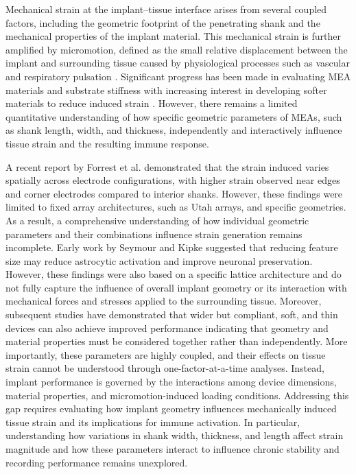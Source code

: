 \documentclass[fleqn,10pt]{wlscirep}
\begin{document}
Mechanical strain at the implant--tissue interface arises from several coupled factors, including the geometric footprint of the penetrating shank and the mechanical properties of the implant material. This mechanical strain is further amplified by micromotion, defined as the small relative displacement between the implant and surrounding tissue caused by physiological processes such as vascular and respiratory pulsation \cite{Subbaroyan2005, AlAbed2022, Muthuswamy2005}. Significant progress has been made in evaluating MEA materials \cite{Subbaroyan2005, AlAbed2022} and substrate stiffness \cite{Subbaroyan2005, Sridharan2015} with increasing interest in developing softer materials to reduce induced strain \cite{Subbaroyan2005, AlAbed2022, Sridharan2015, Lee2005, Mahajan2020, Lecomte2018}. However, there remains a limited quantitative understanding of how specific geometric parameters of MEAs, such as shank length, width, and thickness, independently and interactively influence tissue strain and the resulting immune response.

A recent report by Forrest et al. \cite{Forrest2025} demonstrated that the strain induced varies spatially across electrode configurations, with higher strain observed near edges and corner electrodes compared to interior shanks. However, these findings were limited to fixed array architectures, such as Utah arrays, and specific geometries. As a result, a comprehensive understanding of how individual geometric parameters and their combinations influence strain generation remains incomplete. Early work by Seymour and Kipke \cite{Seymour2007} suggested that reducing feature size may reduce astrocytic activation and improve neuronal preservation. However, these findings were also based on a specific lattice architecture and do not fully capture the influence of overall implant geometry or its interaction with mechanical forces and stresses applied to the surrounding tissue. Moreover, subsequent studies have demonstrated that wider but compliant, soft, and thin devices can also achieve improved performance \cite{Vebraite2021, Pimenta2024, Malekoshoaraie2024} indicating that geometry and material properties must be considered together rather than independently. More importantly, these parameters are highly coupled, and their effects on tissue strain cannot be understood through one-factor-at-a-time analyses. Instead, implant performance is governed by the interactions among device dimensions, material properties, and micromotion-induced loading conditions. Addressing this gap requires evaluating how implant geometry influences mechanically induced tissue strain and its implications for immune activation. In particular, understanding how variations in shank width, thickness, and length affect strain magnitude and how these parameters interact to influence chronic stability and recording performance remains unexplored.
\end{document}
